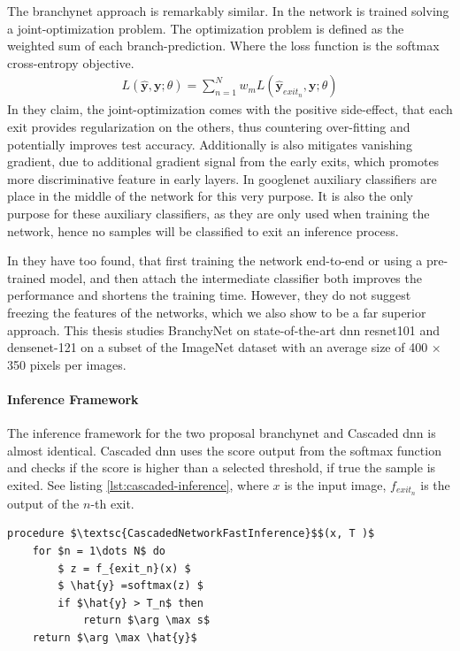 The \gls{branchynet} approach is remarkably similar. In \cite{teerapittayanon_branchynet:_2016} the network is trained solving a joint-optimization problem. The optimization problem is defined as the weighted sum of each branch-prediction. Where the loss function is the softmax cross-entropy objective.
\begin{align*}
L(\hat{\mathbf{y}},\mathbf{y};\theta) = \sum_{n=1}^{N} w_m L(\hat{\mathbf{y}}_{exit_n},\mathbf{y};\theta)
\end{align*}
In \cite{teerapittayanon_branchynet:_2016} they claim, the joint-optimization comes with the positive side-effect, that each exit provides regularization on the others, thus countering over-fitting and potentially improves test accuracy. Additionally is also mitigates vanishing gradient, due to additional gradient signal from the early exits, which promotes more discriminative feature in early layers. In \gls{googlenet} \cite{szegedy_going_2015} auxiliary classifiers are place in the middle of the network for this very purpose. It is also the only purpose for these auxiliary classifiers, as they are only used when training the network, hence no samples will be classified to exit an inference process. 

In \cite{teerapittayanon_branchynet:_2016} they have too found, that first training the network end-to-end or using a pre-trained model, and then attach the intermediate classifier both improves the performance and shortens the training time. However, they do not suggest freezing the features of the networks, which we also show to be a far superior approach. This thesis studies BranchyNet on state-of-the-art \gls{dnn} \gls{resnet}101 and \gls{densenet}-121 on a subset of the ImageNet dataset with an average size of 400 $\times$ 350 pixels per images.  

\paragraph{Inference Framework} The inference framework for the two proposal \gls{branchynet} and Cascaded \gls{dnn} is almost identical. Cascaded \gls{dnn} uses the score output from the softmax function and checks if the score is higher than a selected threshold, if true the sample is exited. See listing \ref{lst:cascaded-inference}, where $ x $ is the input image, $f_{exit_n}$ is the output of the $n$-th exit.

\begin{minipage}{\linewidth}
\begin{lstlisting}[language = {}, mathescape=true, caption={Cascaded Network Fast Inference (Reformulated)}, label={lst:cascaded-inference}]
procedure $\textsc{CascadedNetworkFastInference}$$(x, T )$
	for $n = 1\dots N$ do
		$ z = f_{exit_n}(x) $
		$ \hat{y} =softmax(z) $
		if $\hat{y} > T_n$ then
			return $\arg \max s$
	return $\arg \max \hat{y}$ 
\end{lstlisting}
\end{minipage}

